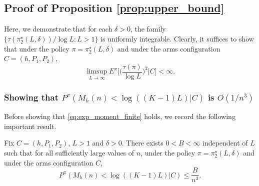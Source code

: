 \subsection{Proof of Proposition \ref{prop:upper_bound}}
\label{appndx:proof_of_prop_upper_bound}
Here, we demonstrate that for each $\delta>0$, the family $\{\tau(\pi_2^\star(L,\delta))/\log L:L>1\}$ is uniformly integrable. Clearly, it suffices to show that under the policy $\pi=\pi_2^\star(L,\delta)$ and under the arms configuration $C=(h, P_1, P_2)$,
\begin{equation}
	\limsup\limits_{L\to\infty}E^\pi\bigg[\bigg(\frac{\tau(\pi)}{\log L}\bigg)^2\bigg|C\bigg]<\infty.
	\label{eq:exp_moment_finite}
\end{equation}

\subsubsection{Showing that $P^\pi(M_h(n)<\log((K-1)L)|C)$ is $O(1/n^3)$}
Before showing that \eqref{eq:exp_moment_finite} holds, we record the following important result.
\begin{lemma}
	\label{lemma:exp_upper_bound_for_a_certain_probability_term}
	Fix $C=(h,P_1,P_2)$, $L> 1$ and $\delta> 0$. There exists $0<B<\infty$ independent of $L$ such that for all sufficiently large values of $n$, under the policy $\pi=\pi_2^\star(L,\delta)$ and under the arms configuration $C$,
	\begin{equation}
		P^\pi(M_h(n)<\log((K-1)L)|C)\leq \frac{B}{n^3}.\label{eq:1/n^4_bound}
	\end{equation}
\end{lemma}
